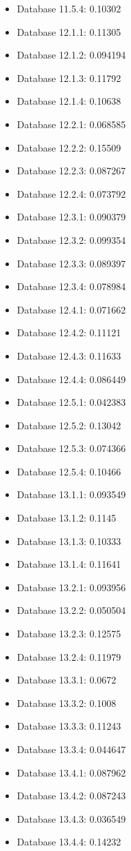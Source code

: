 \begin{itemize}
\item Database 11.5.4: 0.10302
\item Database 12.1.1: 0.11305
\item Database 12.1.2: 0.094194
\item Database 12.1.3: 0.11792
\item Database 12.1.4: 0.10638
\item Database 12.2.1: 0.068585
\item Database 12.2.2: 0.15509
\item Database 12.2.3: 0.087267
\item Database 12.2.4: 0.073792
\item Database 12.3.1: 0.090379
\item Database 12.3.2: 0.099354
\item Database 12.3.3: 0.089397
\item Database 12.3.4: 0.078984
\item Database 12.4.1: 0.071662
\item Database 12.4.2: 0.11121
\item Database 12.4.3: 0.11633
\item Database 12.4.4: 0.086449
\item Database 12.5.1: 0.042383
\item Database 12.5.2: 0.13042
\item Database 12.5.3: 0.074366
\item Database 12.5.4: 0.10466
\item Database 13.1.1: 0.093549
\item Database 13.1.2: 0.1145
\item Database 13.1.3: 0.10333
\item Database 13.1.4: 0.11641
\item Database 13.2.1: 0.093956
\item Database 13.2.2: 0.050504
\item Database 13.2.3: 0.12575
\item Database 13.2.4: 0.11979
\item Database 13.3.1: 0.0672
\item Database 13.3.2: 0.1008
\item Database 13.3.3: 0.11243
\item Database 13.3.4: 0.044647
\item Database 13.4.1: 0.087962
\item Database 13.4.2: 0.087243
\item Database 13.4.3: 0.036549
\item Database 13.4.4: 0.14232

\end{itemize}
